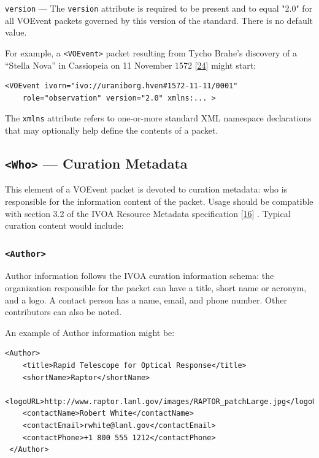 \documentclass[11pt,a4paper]{ivoa}
\begin{document}
 {\tt version} \label{sec:3.1.3} --- 
The {\tt version} attribute is required to be present and to equal "2.0" for all VOEvent packets governed by this version of the standard. There is no default value. 

For example, a {\tt <VOEvent>} packet resulting from Tycho Brahe's discovery of a ``Stella Nova'' in Cassiopeia on 11 November 1572 [\hyperref[bib24]{24}] might start: 
{\footnotesize
\begin{verbatim}
<VOEvent ivorn="ivo://uraniborg.hven#1572-11-11/0001" 
    role="observation" version="2.0" xmlns:... >
\end{verbatim}}
The {\tt xmlns} attribute refers to one-or-more standard XML namespace declarations that may optionally help define the contents of a packet. 

\subsection{{\tt <Who>} --- Curation Metadata}
\label{sec:3.2}
This element of a VOEvent packet is devoted to curation metadata: who is responsible for the information content of the packet. Usage should be compatible with section 3.2 of the IVOA Resource Metadata specification [\hyperref[bib16]{16}]
. Typical curation content would include: 

\subsubsection{\tt <Author>}
Author information follows the IVOA curation information schema: the organization responsible for the packet can have a title, short name or acronym, and a logo. A contact person has a name, email, and phone number. Other contributors can also be noted. 

An example of Author information might be: 
{\footnotesize
\begin{verbatim}
<Author>
    <title>Rapid Telescope for Optical Response</title>
    <shortName>Raptor</shortName>     
    <logoURL>http://www.raptor.lanl.gov/images/RAPTOR_patchLarge.jpg</logoURL>     
    <contactName>Robert White</contactName>     
    <contactEmail>rwhite@lanl.gov</contactEmail>
    <contactPhone>+1 800 555 1212</contactPhone>
 </Author> 
\end{verbatim}}
\end{document}
